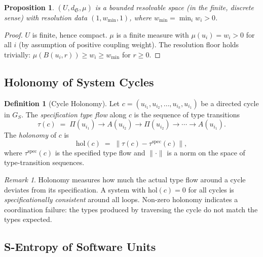 \documentclass[12pt,a4paper,twocolumn]{article}
\theoremstyle{plain}
\newtheorem{proposition}[theorem]{Proposition}
\theoremstyle{definition}
\newtheorem{definition}[theorem]{Definition}
\theoremstyle{remark}
\newtheorem{remark}[theorem]{Remark}
\newcommand{\GS}{G_S}
\newcommand{\hol}{\mathrm{hol}}
\begin{document}
\begin{proposition}
$(U, d_\mathfrak{S}, \mu)$ is a bounded resolvable space (in the finite,
discrete sense) with resolution data $(1, w_{\min}, 1)$, where $w_{\min} =
\min_i w_i > 0$.
\end{proposition}

\begin{proof}
$U$ is finite, hence compact.  $\mu$ is a finite measure with $\mu(u_i) =
w_i > 0$ for all $i$ (by assumption of positive coupling weight).  The
resolution floor holds trivially: $\mu(B(u_i, r)) \geq w_i \geq w_{\min}$
for $r \geq 0$.
\end{proof}

\subsection{Holonomy of System Cycles}

\begin{definition}[Cycle Holonomy]
\label{def:holonomy}
Let $c = (u_{i_1}, u_{i_2}, \ldots, u_{i_k}, u_{i_1})$ be a directed cycle
in $\GS$.  The \emph{specification type flow} along $c$ is the sequence of
type transitions
\begin{equation}
  \tau(c) \;=\; \Pi(u_{i_1}) \to A(u_{i_2}) \to \Pi(u_{i_2}) \to \cdots
    \to A(u_{i_1}).
\end{equation}
The \emph{holonomy} of $c$ is
\begin{equation}
  \hol(c) \;=\; \left\| \tau(c) - \tau^{\mathrm{spec}}(c) \right\|,
\end{equation}
where $\tau^{\mathrm{spec}}(c)$ is the specified type flow and $\|\cdot\|$
is a norm on the space of type-transition sequences.
\end{definition}

\begin{remark}
Holonomy measures how much the actual type flow around a cycle deviates from
its specification.  A system with $\hol(c) = 0$ for all cycles is
\emph{specificationally consistent} around all loops.  Non-zero holonomy
indicates a coordination failure: the types produced by traversing the cycle
do not match the types expected.
\end{remark}

\subsection{S-Entropy of Software Units}
\end{document}
